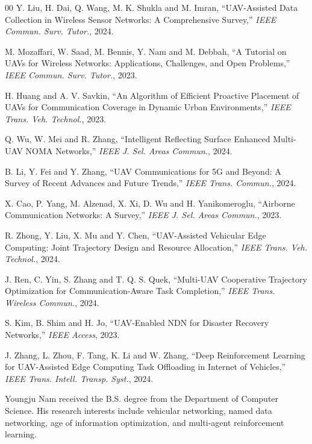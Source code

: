 \documentclass[journal]{IEEEtran}
\begin{document}
\begin{thebibliography}{00}
 Y. Liu, H. Dai, Q. Wang, M. K. Shukla and M. Imran, ``UAV-Assisted Data Collection in Wireless Sensor Networks: A Comprehensive Survey,'' \emph{IEEE Commun. Surv. Tutor.}, 2024.

 M. Mozaffari, W. Saad, M. Bennis, Y. Nam and M. Debbah, ``A Tutorial on UAVs for Wireless Networks: Applications, Challenges, and Open Problems,'' \emph{IEEE Commun. Surv. Tutor.}, 2023.

 H. Huang and A. V. Savkin, ``An Algorithm of Efficient Proactive Placement of UAVs for Communication Coverage in Dynamic Urban Environments,'' \emph{IEEE Trans. Veh. Technol.}, 2023.

 Q. Wu, W. Mei and R. Zhang, ``Intelligent Reflecting Surface Enhanced Multi-UAV NOMA Networks,'' \emph{IEEE J. Sel. Areas Commun.}, 2024.

 B. Li, Y. Fei and Y. Zhang, ``UAV Communications for 5G and Beyond: A Survey of Recent Advances and Future Trends,'' \emph{IEEE Trans. Commun.}, 2024.

 X. Cao, P. Yang, M. Alzenad, X. Xi, D. Wu and H. Yanikomeroglu, ``Airborne Communication Networks: A Survey,'' \emph{IEEE J. Sel. Areas Commun.}, 2023.

 R. Zhong, Y. Liu, X. Mu and Y. Chen, ``UAV-Assisted Vehicular Edge Computing: Joint Trajectory Design and Resource Allocation,'' \emph{IEEE Trans. Veh. Technol.}, 2024.

 J. Ren, C. Yin, S. Zhang and T. Q. S. Quek, ``Multi-UAV Cooperative Trajectory Optimization for Communication-Aware Task Completion,'' \emph{IEEE Trans. Wireless Commun.}, 2024.

 S. Kim, B. Shim and H. Jo, ``UAV-Enabled NDN for Disaster Recovery Networks,'' \emph{IEEE Access}, 2023.

 J. Zhang, L. Zhou, F. Tang, K. Li and W. Zhang, ``Deep Reinforcement Learning for UAV-Assisted Edge Computing Task Offloading in Internet of Vehicles,'' \emph{IEEE Trans. Intell. Transp. Syst.}, 2024.
\end{thebibliography}

\begin{IEEEbiography}[]{Youngju Nam}
received the B.S. degree from the Department of Computer Science. His research interests include vehicular networking, named data networking, age of information optimization, and multi-agent reinforcement learning.
\end{IEEEbiography}
\end{document}
